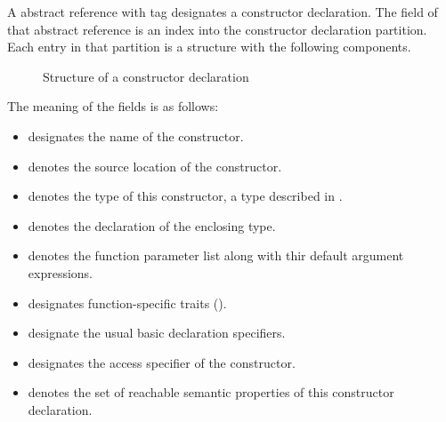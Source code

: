 A  abstract reference with tag  designates a constructor declaration.
The  field of that abstract reference is an index into the constructor declaration partition.
Each entry in that partition is a structure with the following components.
%
\begin{figure}[H]
	\centering
	\caption{Structure of a constructor declaration}
	\label{fig:ifc-constructor-decl-structure}
\end{figure}
%
The meaning of the fields is as follows:
\begin{itemize}
	\item {} designates the name of the constructor.
	\item {} denotes the source location of the constructor.
	\item {} denotes the type of this constructor, a type described in .
	\item {} denotes the declaration of the enclosing type.
	\item {} denotes the function parameter list along with thir default argument expressions.
	\item {} designates function-specific traits ().
	\item {} designate the usual basic declaration specifiers.
	\item {} designates the access specifier of the constructor.
	\item {} denotes the set of reachable semantic properties of this constructor declaration.
\end{itemize}

